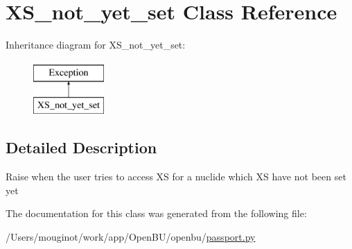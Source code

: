 \hypertarget{classopenbu_1_1passport_1_1_x_s__not__yet__set}{}\section{X\+S\+\_\+not\+\_\+yet\+\_\+set Class Reference}
\label{classopenbu_1_1passport_1_1_x_s__not__yet__set}
Inheritance diagram for X\+S\+\_\+not\+\_\+yet\+\_\+set\+:\begin{figure}[H]
\begin{center}
\leavevmode
\includegraphics[height=2.000000cm]{classopenbu_1_1passport_1_1_x_s__not__yet__set}
\end{center}
\end{figure}


\subsection{Detailed Description}
\begin{DoxyVerb}Raise when the user tries to access XS for a nuclide which XS have not been set yet \end{DoxyVerb}
 

The documentation for this class was generated from the following file\+:\begin{DoxyCompactItemize}
\item 
/\+Users/mouginot/work/app/\+Open\+B\+U/openbu/\mbox{\hyperlink{passport_8py}{passport.\+py}}\end{DoxyCompactItemize}
